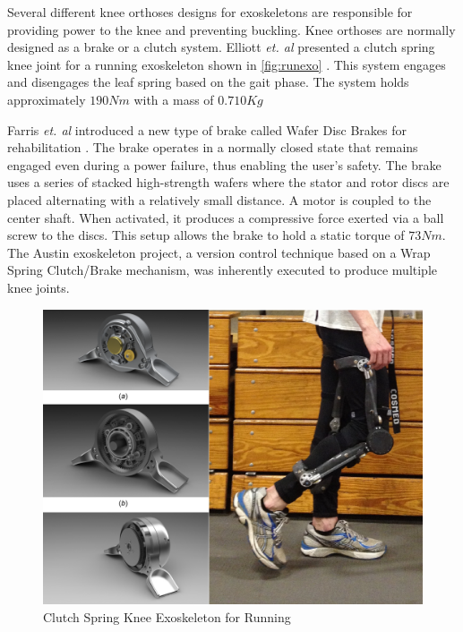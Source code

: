 Several different knee orthoses designs for exoskeletons are responsible for providing power to the knee and preventing buckling.  Knee orthoses are normally designed as a brake or a clutch system. Elliott \textit{et. al} presented a clutch spring knee joint for a running exoskeleton shown in \autoref{fig:runexo} \cite{elliott2014design}. This system engages and disengages the leaf spring based on the gait phase. The system holds approximately $190Nm$ with a mass of $0.710Kg$

Farris \textit{et. al} introduced a new type of brake called Wafer Disc Brakes for rehabilitation \cite{farris2009design}. The brake operates in a normally closed state that remains engaged even during a power failure, thus enabling the user's safety. The brake uses a series of stacked high-strength wafers where the stator and rotor discs are placed alternating with a relatively small distance. A motor is coupled to the center shaft. When activated, it produces a compressive force exerted via a ball screw to the discs. This setup allows the brake to hold a static torque of $73Nm$. The Austin exoskeleton project, a version control technique based on a Wrap Spring Clutch/Brake mechanism, was inherently executed to produce multiple knee joints.
 
 
 \begin{figure}[h]
    \centering
    \includegraphics[scale=0.30, frame]{images/background/clutch.png}
    \caption[Clutch Spring Knee]{Clutch Spring Knee Exoskeleton for Running \cite{elliott2014design}}
    \label{fig:runexo}
\end{figure} 


